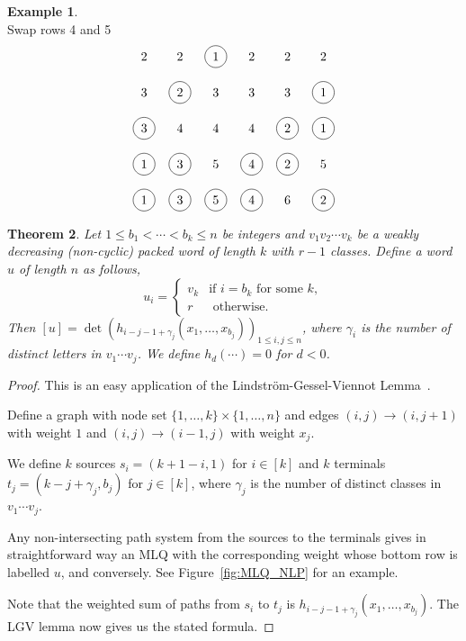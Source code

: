 \documentclass[reqno]{amsart}
\newcommand{\0}{\phantom{c}}
\theoremstyle{plain}
\newtheorem{thm}{Theorem}[section]
\theoremstyle{definition}
\newtheorem{example}[thm]{Example}
\numberwithin{equation}{section}
\begin{document}
\begin{example}
\[\]
Swap rows 4 and 5
\[
\begin{tikzpicture}\node at (0, 5){2};\node at (1, 5){2};\node[circle, draw=black] at (2, 5){1};\node at (3, 5){2};\node at (4, 5){2};\node at (5, 5){2};\node at (0, 4){3};\node[circle, draw=black] at (1, 4){2};\node at (2, 4){3};\node at (3, 4){3};\node at (4, 4){3};\node[circle, draw=black] at (5, 4){1};\node[circle, draw=black] at (0, 3){3};\node at (1, 3){4};\node at (2, 3){4};\node at (3, 3){4};\node[circle, draw=black] at (4, 3){2};\node[circle, draw=black] at (5, 3){1};\node[circle, draw=black] at (0, 2){1};\node[circle, draw=black] at (1, 2){3};\node at (2, 2){5};\node[circle, draw=black] at (3, 2){4};\node[circle, draw=black] at (4, 2){2};\node at (5, 2){5};\node[circle, draw=black] at (0, 1){1};\node[circle, draw=black] at (1, 1){3};\node[circle, draw=black] at (2, 1){5};\node[circle, draw=black] at (3, 1){4};\node at (4, 1){6};\node[circle, draw=black] at (5, 1){2};\end{tikzpicture}
\]
\end{example}


\begin{thm}
\label{thm:determinant_form}
  Let $1 \leq b_1 < \cdots < b_k \leq n$ be integers and $v_1v_2 \dotsm v_k$ be a weakly decreasing (non-cyclic) packed word of length $k$ with $r-1$ classes. Define a word $u$ of length $n$ as follows,
  \[
  u_i = \begin{cases}
  v_k & \text{if $i = b_k$ for some $k$}, \\
  r & \text{ otherwise}.
  \end{cases}
  \]
  Then $[u] = \det(h_{i-j-1+\gamma_j}(x_1, \dotsc, x_{b_j}))_{1\leq i,j\leq n}$, where $\gamma_i$ is the number of distinct letters in $v_1\dotsm v_j$. We define $h_d(\cdots) = 0$ for $d < 0$.
\end{thm}

\begin{proof}
This is an easy application of the Lindstr\"om-Gessel-Viennot Lemma~\cite{Lindstrom73,GV85}.

Define a graph with node set $\{1,\dotsc,k\} \times \{1, \dotsc, n\}$ and edges $(i,j) \to (i,j+1)$ with weight $1$ and $(i,j) \to (i-1,j)$ with weight $x_j$. 

We define $k$ sources $s_i = (k+1-i, 1)$ for $i\in[k]$ and $k$ terminals $t_j = (k-j+\gamma_j,b_j)$ for $j\in[k]$, where $\gamma_j$ is the number of distinct classes in $v_1\dotsm v_j$.

Any non-intersecting path system from the sources to the terminals gives in straightforward way an MLQ with the corresponding weight whose bottom row is labelled $u$, and conversely. See Figure~\ref{fig:MLQ_NLP} for an example.

Note that the weighted sum of paths from $s_i$ to $t_j$ is $h_{i-j-1+\gamma_j}(x_1,\dots,x_{b_j})$. The LGV lemma now gives us the stated formula.
\end{proof}
\end{document}
